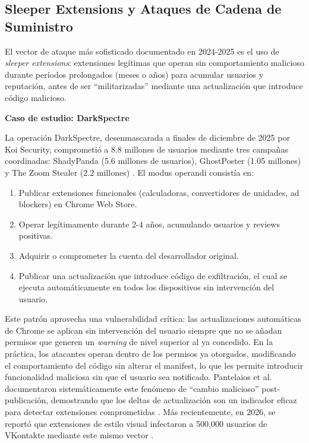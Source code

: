 \documentclass[12pt,oneside]{report}
\begin{document}
\subsection{Sleeper Extensions y Ataques de Cadena de Suministro}

El vector de ataque más sofisticado documentado en 2024-2025 es el uso de \textit{sleeper extensions}: extensiones legítimas que operan sin comportamiento malicioso durante períodos prolongados (meses o años) para acumular usuarios y reputación, antes de ser ``militarizadas'' mediante una actualización que introduce código malicioso.

\textbf{Caso de estudio: DarkSpectre}

La operación DarkSpectre, desenmascarada a finales de diciembre de 2025 por Koi Security, comprometió a 8.8 millones de usuarios mediante tres campañas coordinadas: ShadyPanda (5.6 millones de usuarios), GhostPoster (1.05 millones) y The Zoom Stealer (2.2 millones) \cite{koi2025darkspectre}. El modus operandi consistía en:

\begin{enumerate}
    \item Publicar extensiones funcionales (calculadoras, convertidores de unidades, ad blockers) en Chrome Web Store.
    \item Operar legítimamente durante 2-4 años, acumulando usuarios y reviews positivas.
    \item Adquirir o comprometer la cuenta del desarrollador original.
    \item Publicar una actualización que introduce código de exfiltración, el cual se ejecuta automáticamente en todos los dispositivos sin intervención del usuario.
\end{enumerate}

Este patrón aprovecha una vulnerabilidad crítica: las actualizaciones automáticas de Chrome se aplican sin intervención del usuario siempre que no se añadan permisos que generen un \textit{warning} de nivel superior al ya concedido. En la práctica, los atacantes operan dentro de los permisos ya otorgados, modificando el comportamiento del código sin alterar el manifest, lo que les permite introducir funcionalidad maliciosa sin que el usuario sea notificado. Pantelaios et al. documentaron sistemáticamente este fenómeno de ``cambio malicioso'' post-publicación, demostrando que los deltas de actualización son un indicador eficaz para detectar extensiones comprometidas \cite{pantelaios2020malicious}. Más recientemente, en 2026, se reportó que extensiones de estilo visual infectaron a 500,000 usuarios de VKontakte mediante este mismo vector \cite{kathir2026vkstyles}.
\end{document}

